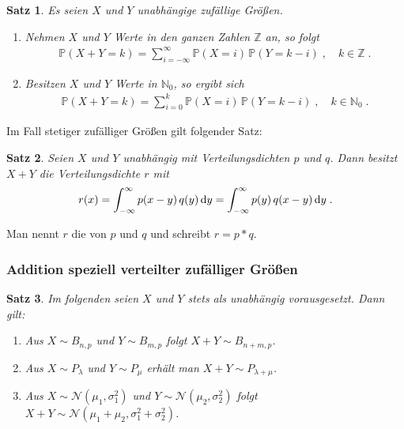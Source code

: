 \documentclass[ngerman,draft,parskip=half,twoside]{scrartcl}
\newtheorem{thm}{Satz}[section]
\newcommand*{\highl}[2][]{\textbf{\boldmath{#2}}%
  \ifthenelse{\equal{#1}{}}{\index{#2}}{\index{#1}}%
}
\newcommand*{\N}{\mathbb{N}}      %
\newcommand*{\Z}{\mathbb{Z}}      %
\newcommand*{\WKM}{\mathbb{P}}      %
\newcommand*{\NormVert}{\mathcal{N}} %
\newcommand*{\diff}[1]{%
  \mathop{\mathrm{\mathstrut d}}%
  \ifx#1(\else%
  \ifx#1[\else%
  \ifx#1\{\else%
    \!%
  \fi\fi\fi#1%
}
\begin{document}
\begin{thm}
  Es seien $X$ und $Y$ unabhängige zufällige Größen.
  \begin{enumerate}
   \item Nehmen $X$ und $Y$ Werte in den ganzen Zahlen $\Z$ an, so folgt
    \begin{gather*}
      \WKM(X+Y=k)
         =\sum_{i=-\infty}^\infty\WKM(X=i)\,\WKM(Y=k-i)\;,\quad k\in \Z\;.
    \end{gather*}

   \item Besitzen $X$ und $Y$ Werte in $\N_0$, so ergibt sich
    \begin{gather*}
      \WKM(X+Y=k)=\sum_{i=0}^k\WKM(X=i)\,\WKM(Y=k-i)\;,\quad k\in \N_0\;.
    \end{gather*}
\end{enumerate}
\end{thm}

Im Fall stetiger zufälliger Größen gilt folgender Satz:
\begin{thm}
  Seien $X$ und $Y$ unabhängig mit Verteilungsdichten $p$ und $q$. Dann besitzt
  $X+Y$ die Verteilungsdichte $r$ mit
  \begin{gather*}
    r(x)
       =\int_{-\infty}^\infty p(x-y)\,q(y)\diff{y}
       = \int_{-\infty}^\infty p(y)\,q(x-y)\diff{y} \;.
  \end{gather*}
\end{thm}

Man nennt $r$ die \highl{Faltung} von $p$ und $q$ und schreibt $r=p*q$.

\subsubsection{Addition speziell verteilter zufälliger Größen}

\begin{thm}
  Im folgenden seien $X$ und $Y$ stets als unabhängig vorausgesetzt. Dann gilt:
  \begin{enumerate}[label=(\alph*)]
   \item Aus $X\sim B_{n,p}$ und $Y\sim B_{m,p}$ folgt $X+Y\sim B_{n+m,p}$.

   \item Aus $X\sim P_\lambda$ und $Y\sim P_\mu$ erhält man $X+Y\sim
    P_{\lambda+\mu}$.

   \item Aus $X\sim\NormVert(\mu_1,\sigma_1^2)$ und
    $Y\sim\NormVert(\mu_2,\sigma_2^2)$ folgt $X+Y\sim
    \NormVert(\mu_1+\mu_2,\sigma_1^2+\sigma_2^2)$.
  \end{enumerate}
\end{thm}
\end{document}
